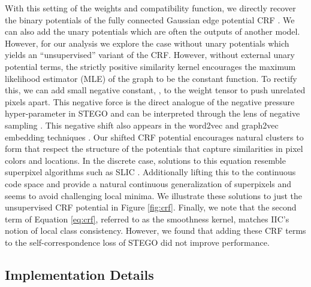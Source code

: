 \documentclass{article} \usepackage{iclr2022_conference,times}
\begin{document}
With this setting of the weights and compatibility function, we directly recover the binary potentials of the fully connected Gaussian edge potential CRF \citep{fullcrf}. We can also add the unary potentials which are often the outputs of another model. However, for our analysis we explore the case without unary potentials which yields an ``unsupervised'' variant of the CRF. However, without external unary potential terms, the strictly positive similarity kernel encourages the maximum likelihood estimator (MLE) of the graph to be the constant function. To rectify this, we can add small negative constant, , to the weight tensor to push unrelated pixels apart. This negative force is the direct analogue of the negative pressure hyper-parameter in STEGO and can be interpreted through the lens of negative sampling  \citep{mikolov2013distributed}. This negative shift also appears in the word2vec and graph2vec embedding techniques \citep{narayanan2017graph2vec,levy2014neural}. Our shifted CRF potential encourages natural clusters to form that respect the structure of the potentials that capture similarities in pixel colors and locations. In the discrete case, solutions to this equation resemble superpixel algorithms such as SLIC \citep{zhang2015slic}. Additionally lifting this to the continuous code space and provide a natural continuous generalization of superpixels and seems to avoid challenging local minima. We illustrate these solutions to just the unsupervised CRF potential in Figure \ref{fig:crf}. Finally, we note that the second term of Equation \ref{eq:crf}, referred to as the smoothness kernel, matches IIC's notion of local class consistency. However, we found that adding these CRF terms to the self-correspondence loss of STEGO did not improve performance.

\newpage

\subsection{Implementation Details}
 \label{sec:implementation-details}
\end{document}
